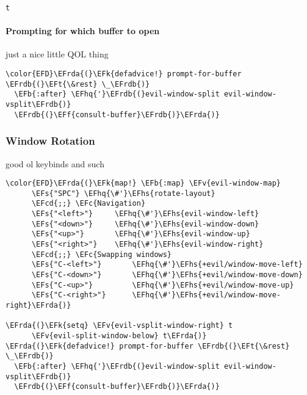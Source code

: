 \documentclass{article}
\newcommand{\EFc}[1]{\textcolor{EFc}{#1}} %
\newcommand{\EFcd}[1]{\textcolor{EFcd}{#1}} %
\newcommand{\EFs}[1]{\textcolor{EFs}{#1}} %
\newcommand{\EFk}[1]{\textcolor{EFk}{#1}} %
\newcommand{\EFb}[1]{\textcolor{EFb}{#1}} %
\newcommand{\EFf}[1]{\textcolor{EFf}{#1}} %
\newcommand{\EFv}[1]{\textcolor{EFv}{#1}} %
\newcommand{\EFt}[1]{\textcolor{EFt}{#1}} %
\newcommand{\EFhq}[1]{#1} %
\newcommand{\EFhs}[1]{\textcolor{EFhs}{#1}} %
\newcommand{\EFrda}[1]{\textcolor{EFrda}{#1}} %
\newcommand{\EFrdb}[1]{\textcolor{EFrdb}{#1}} %
\begin{document}
\begin{verbatim}
t
\end{verbatim}

\paragraph{Prompting for which buffer to open}
\label{sec:org20de6a4}
just a nice little QOL thing
\begin{Code}
\begin{Verbatim}
\color{EFD}\EFrda{(}\EFk{defadvice!} prompt-for-buffer \EFrdb{(}\EFt{\&rest} \_\EFrdb{)}
  \EFb{:after} \EFhq{'}\EFrdb{(}evil-window-split evil-window-vsplit\EFrdb{)}
  \EFrdb{(}\EFf{consult-buffer}\EFrdb{)}\EFrda{)}
\end{Verbatim}
\end{Code}

\subsubsection{Window Rotation}
\label{sec:org029689d}
good ol keybinds and such
\begin{Code}
\begin{Verbatim}
\color{EFD}\EFrda{(}\EFk{map!} \EFb{:map} \EFv{evil-window-map}
      \EFs{"SPC"} \EFhq{\#'}\EFhs{rotate-layout}
      \EFcd{;;} \EFc{Navigation}
      \EFs{"<left>"}     \EFhq{\#'}\EFhs{evil-window-left}
      \EFs{"<down>"}     \EFhq{\#'}\EFhs{evil-window-down}
      \EFs{"<up>"}       \EFhq{\#'}\EFhs{evil-window-up}
      \EFs{"<right>"}    \EFhq{\#'}\EFhs{evil-window-right}
      \EFcd{;;} \EFc{Swapping windows}
      \EFs{"C-<left>"}       \EFhq{\#'}\EFhs{+evil/window-move-left}
      \EFs{"C-<down>"}       \EFhq{\#'}\EFhs{+evil/window-move-down}
      \EFs{"C-<up>"}         \EFhq{\#'}\EFhs{+evil/window-move-up}
      \EFs{"C-<right>"}      \EFhq{\#'}\EFhs{+evil/window-move-right}\EFrda{)}

\EFrda{(}\EFk{setq} \EFv{evil-vsplit-window-right} t
      \EFv{evil-split-window-below} t\EFrda{)}
\EFrda{(}\EFk{defadvice!} prompt-for-buffer \EFrdb{(}\EFt{\&rest} \_\EFrdb{)}
  \EFb{:after} \EFhq{'}\EFrdb{(}evil-window-split evil-window-vsplit\EFrdb{)}
  \EFrdb{(}\EFf{consult-buffer}\EFrdb{)}\EFrda{)}
\end{Verbatim}
\end{Code}
\end{document}
